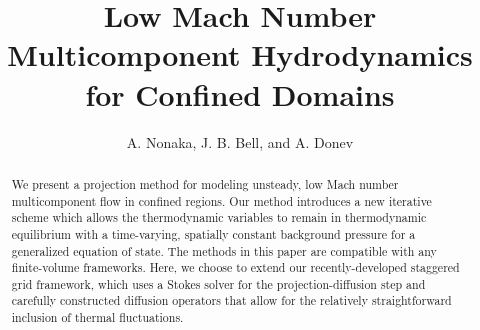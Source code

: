 \documentclass[final]{siamltex}
\begin{document}
\title{Low Mach Number Multicomponent Hydrodynamics for Confined Domains}

\author{A. Nonaka\footnotemark[1],
        J. B. Bell\footnotemark[1], and
        A. Donev\footnotemark[2]}

\renewcommand{\thefootnote}{\fnsymbol{footnote}}


\maketitle

\begin{abstract}
We present a projection method for modeling unsteady, low Mach number multicomponent
flow in confined regions.  Our method introduces a new iterative scheme which
allows the thermodynamic variables to remain in thermodynamic equilibrium
with a time-varying, spatially constant background pressure for a
generalized equation of state.
The methods in this paper are compatible with any finite-volume frameworks.
Here, we choose to extend our recently-developed staggered grid framework,
which uses a Stokes solver for the projection-diffusion step and carefully
constructed diffusion operators that allow for the relatively straightforward
inclusion of thermal fluctuations.
\end{abstract}
\end{document}
